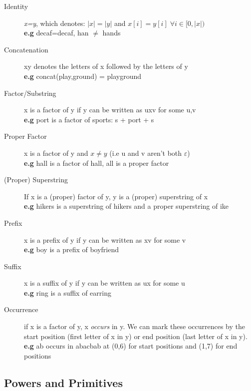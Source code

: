 \begin{description}
    \item[Identity] \emph{x=y}, which denotes: \(|x|=|y|\) and \(x[i] = y[i]\; \forall i \in[0, |x|)\) \\
        \textbf{e.g} decaf=decaf, han $\neq$ hands
    \item[Concatenation] xy denotes the letters of x followed by the letters of y \\
        \textbf{e.g} concat(play,ground) = playground
    \item[Factor/Substring] x is a factor of y if y can be written as uxv for some u,v \\
        \textbf{e.g} port is a factor of sports: s + port + s
    \item[Proper Factor] x is a factor of y and $x\neq y$ (i.e u and v aren't both $\varepsilon$)\\
         \textbf{e.g} hall is a factor of hall, all is a proper factor
    \item[(Proper) Superstring] If x is a (proper) factor of y, y is a (proper) superstring of x\\
        \textbf{e.g} hikers is a superstring of hikers and a proper superstring of ike
    \item[Prefix] x is a prefix of y if y can be written as xv for some v\\
        \textbf{e.g} boy is a prefix of boyfriend
    \item[Suffix] x is a suffix of y if y can be written as ux for some u\\
        \textbf{e.g} ring is a suffix of earring    
    \item[Occurrence] if x is a factor of y, x \emph{occurs} in y. We can mark these occurrences by the start position (first letter of x in y) or end position (last letter of x in y). \\ \textbf{e.g} ab occurs in abacbab at (0,6) for start positions and (1,7) for end positions
\end{description}
\newpage
\subsection{Powers and Primitives}


